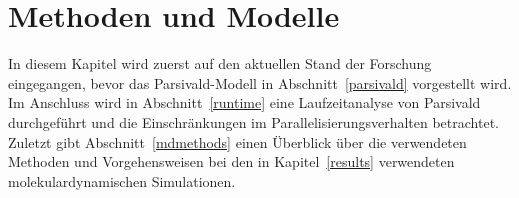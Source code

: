 \chapter{Methoden und Modelle}
\label{models}

In diesem Kapitel wird zuerst auf den aktuellen Stand der Forschung eingegangen, bevor das Parsivald-Modell in Abschnitt~\ref{parsivald} vorgestellt wird.
Im Anschluss wird in Abschnitt~\ref{runtime} eine Laufzeitanalyse von Parsivald durchgeführt und die Einschränkungen im Parallelisierungsverhalten betrachtet.
Zuletzt gibt Abschnitt~\ref{mdmethods} einen Überblick über die verwendeten Methoden und Vorgehensweisen bei den in Kapitel~\ref{results} verwendeten molekulardynamischen Simulationen.


\clearpage

\clearpage

\clearpage

